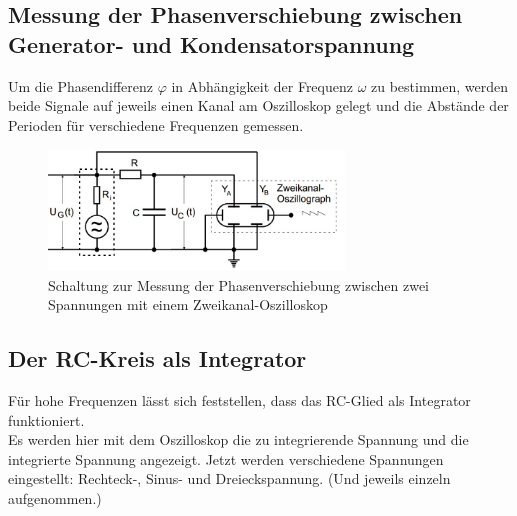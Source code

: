 \subsection{Messung der Phasenverschiebung zwischen Generator- und
  Kondensatorspannung}

Um die Phasendifferenz $\varphi$ in Abhängigkeit der Frequenz $\omega$
zu bestimmen, werden beide Signale auf jeweils einen Kanal am Oszilloskop gelegt und die Abstände der Perioden für verschiedene Frequenzen gemessen.
\begin{figure}[h]
  \centering
  \includegraphics[width=0.7\textwidth]{Grafiken/V353_Abb3.jpg}
  \caption{Schaltung zur Messung der Phasenverschiebung zwischen zwei Spannungen mit einem Zweikanal-Oszilloskop}
  \label{fig:V353_Abb3}
\end{figure}
\subsection{Der RC-Kreis als Integrator}
Für hohe Frequenzen lässt sich feststellen, dass das RC-Glied als Integrator funktioniert.\\
Es werden hier mit dem Oszilloskop die zu integrierende Spannung und die integrierte Spannung angezeigt. Jetzt werden verschiedene Spannungen
eingestellt: Rechteck-, Sinus- und Dreieckspannung. (Und jeweils einzeln aufgenommen.)
